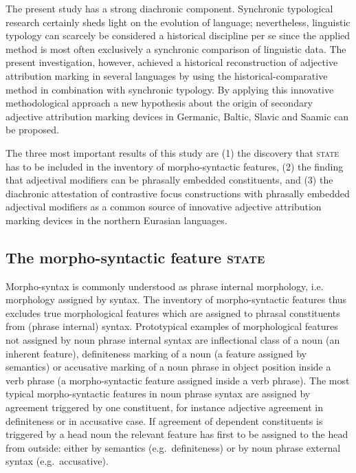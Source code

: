 The present study has a strong diachronic component. Synchronic typological research certainly sheds light on the evolution of language; nevertheless, linguistic typology can scarcely be considered a historical discipline per se since the applied method is most often exclusively a synchronic comparison of linguistic data. The present investigation, however, achieved a historical reconstruction of adjective attribution marking in several languages by using the historical-comparative method in combination with synchronic typology. By applying this innovative methodological approach a new hypothesis about the origin of secondary adjective attribution marking devices in Germanic, Baltic, Slavic and Saamic can be proposed. 

The three most important results of this study are (1) the discovery that \textsc{state} has to be included in the inventory of morpho-syntactic features, (2) the finding that adjectival modifiers can be phrasally embedded constituents, and (3) the diachronic attestation of contrastive focus constructions with phrasally embedded adjectival modifiers as a common source of innovative adjective attribution marking devices in the northern Eurasian languages.

\subsection{The morpho-syntactic feature \textsc{state}}
Morpho-syntax is commonly understood as phrase internal morphology, i.e. morphology assigned by syntax. The inventory of morpho-syntactic features thus excludes true morphological features which are assigned to phrasal constituents from (phrase internal) syntax. Prototypical examples of morphological features not assigned by noun phrase internal syntax are inflectional class of a noun (an inherent feature), definiteness marking of a noun (a feature assigned by semantics) or accusative marking of a noun phrase in object position inside a verb phrase (a morpho-syntactic feature assigned inside a verb phrase). The most typical morpho-syntactic features in noun phrase syntax are assigned by agreement triggered by one constituent, for instance adjective agreement in definiteness or in accusative case. If agreement of dependent constituents is triggered by a head noun the relevant feature has first to be assigned to the head from outside: either by semantics (e.g.~definiteness) or by noun phrase external syntax (e.g.~accusative). 

